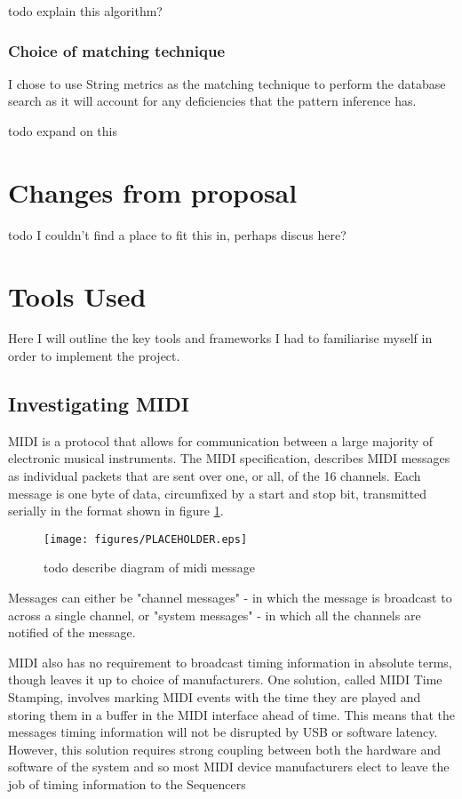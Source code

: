 \documentclass[12pt,twoside,notitlepage]{report}
\begin{document}
			todo explain this algorithm?
			
			\subsubsection{Choice of matching technique}
			I chose to use String metrics as the matching technique to perform the database search as it will account for any deficiencies that the pattern inference has. 			
			
			todo expand on this
			
	\section{Changes from proposal}
	
	todo I couldn't find a place to fit this in, perhaps discus here?	
	\section{Tools Used}
	Here I will outline the key tools and frameworks I had to familiarise myself in order to implement the project.
		\subsection{\label{Midi}Investigating MIDI}
		MIDI is a protocol that allows for communication between a large majority of electronic musical instruments. The MIDI specification\cite{MIDI}, describes MIDI messages as individual packets that are sent over one, or all, of the 16 channels. Each message is one byte of data, circumfixed by a start and stop bit, transmitted serially in the format shown in figure \ref{MIDIMessage}. 		
		
			\begin{figure}[h]
			\centerline{\texttt{[image: figures/PLACEHOLDER.eps]}}
			\caption{\label{MIDIMessage} todo describe diagram of midi message}
\end{figure}

		Messages can either be "channel messages" - in which the message is broadcast to across a single channel, or "system messages" - in which all the channels are notified of the message.
		
		MIDI also has no requirement to broadcast timing information in absolute terms, though leaves it up to choice of manufacturers. One solution, called MIDI Time Stamping\cite{Walker2007}, involves marking MIDI events with the time they are played and storing them in a buffer in the MIDI interface ahead of time. This means that the messages timing information will not be disrupted by USB or software latency. However, this solution requires strong coupling between both the hardware and software of the system and so most MIDI device manufacturers elect to leave the job of timing information to the Sequencers
		
\end{document}
